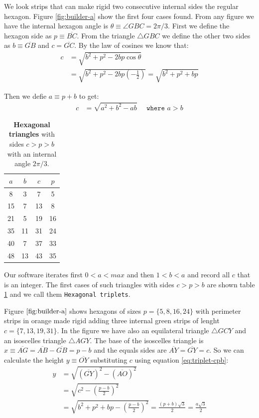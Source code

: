\documentclass[11pt]{article}
\begin{document}
We look strips that can make rigid two consecutive internal sides the regular hexagon. Figure \ref{fig:builder-a} show the first four cases found. From any figure we have the internal hexagon angle is $\theta \equiv \angle{GBC} = 2\pi/3$. First we define the hexagon side as $p \equiv \overline{BC}$. From the triangle $\triangle{GBC}$ we define the other two sides as $b \equiv \overline{GB}$ and $c = \overline{GC}$. By the law of cosines we know that:
\begin{align}
c &= \sqrt{b^2 + p^2 - 2bp\cos\theta} \nonumber\\
 &= \sqrt{b^2 + p^2 - 2bp\left(-\frac{1}{2}\right)}
 = \sqrt{b^2 + p^2 + bp} \label{eq:triplet-cpb}
\end{align}

Then we defie $a \equiv p + b$ to get:
\begin{align}
c &= \sqrt{a^2 + b^2 - ab} \quad \texttt{ where } a > b
\end{align}

\begin{table}[H]
\begin{center}
\begin{tabular}{| c | c c c |} 
 \hline
 $a$ & $b$ & $c$ & $p$ \\ [0.5ex] 
 \hline\hline
  8 &  3 &  7 &  5 \\ \hline
 15 &  7 & 13 &  8 \\ \hline
 21 &  5 & 19 & 16 \\ \hline
 35 & 11 & 31 & 24 \\ \hline
 40 &  7 & 37 & 33 \\ \hline
 48 & 13 & 43 & 35 \\ \hline
\end{tabular}
\caption{\textbf{Hexagonal triangles} with sides $c > p > b$ with an internal angle $2\pi/3$.}
\label{tbl:triplets}
\end{center}
\end{table}

Our software iterates first $0 < a < max$ and then $1 < b < a$ and record all $c$ that is an integer. The first cases of such triangles with sides $c > p > b$ are shown table \ref{tbl:triplets} and we call them \texttt{Hexagonal triplets}.

Figure $\ref{fig:builder-a}$ shows hexagons of sizes $p = \{5,8,16,24\}$ with perimeter strips in orange made rigid adding three internal green strips of lenght $c = \{7,13,19,31\}$. In the figure we have also an equilateral triangle $\triangle{GCY}$ and an isoscelles triangle $\triangle{AGY}$. The base of the isoscelles triangle is $x \equiv \overline{AG} = \overline{AB} - \overline{GB} = p - b$ and the equals sides are $\overline{AY} = \overline{GY} = c$. So we can calculate the height $y \equiv \overline{OY}$ substituting $c$ using equation \ref{eq:triplet-cpb}:
\begin{align}
y &= \sqrt{(\overline{GY})^2 - (\overline{AO})^2} \nonumber\\
 &= \sqrt{c^2 - \left(\frac{p - b}2\right)^2} \nonumber\\
 &= \sqrt{b^2 + p^2 + bp - \left(\frac{p-b}2\right)^2}
  = \frac{(p + b)\sqrt3}2 = \frac{a\sqrt3}2
\end{align}
\end{document}
